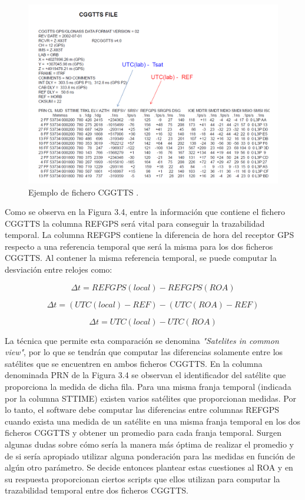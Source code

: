\begin{figure}
	\centering
	\includegraphics[width=1\textwidth]{imagenes/cggtts.PNG}
	\caption{\label{fig1}Ejemplo de fichero CGGTTS \cite{timetransfer}.}
\end{figure}

Como se observa en la Figura 3.4, entre la información que contiene el fichero CGGTTS la columna REFGPS será vital para conseguir la trazabilidad temporal. La columna REFGPS contiene la diferencia de hora del receptor GPS respecto a una referencia temporal que será la misma para los dos ficheros CGGTTS. Al contener la misma referencia temporal, se puede computar la desviación entre relojes como:

\begin{equation}
\Delta t = REFGPS(local) - REFGPS(ROA) 
\end{equation}

\begin{equation}
\Delta t = (UTC(local) - REF) - (UTC(ROA) - REF)
\end{equation}

\begin{equation}
\Delta t = UTC(local) - UTC(ROA)
\end{equation}

La técnica que permite esta comparación se denomina \textit{"Satelites in common view"}, por lo que se tendrán que computar las diferencias solamente entre los satélites que se encuentren en ambos ficheros CGGTTS. En la columna denominada PRN de la Figura 3.4 se observan el identificador del satélite que proporciona la medida de dicha fila. Para una misma franja temporal (indicada por la columna STTIME) existen varios satélites que proporcionan medidas. Por lo tanto, el software debe computar las diferencias entre columnas REFGPS cuando exista una medida de un satélite en una misma franja temporal en los dos ficheros CGGTTS y obtener un promedio para cada franja temporal. Surgen algunas dudas sobre cómo sería la manera más óptima de realizar el promedio y de si sería apropiado utilizar alguna ponderación para las medidas en función de algún otro parámetro. Se decide entonces plantear estas cuestiones al ROA y en su respuesta proporcionan ciertos scripts que ellos utilizan para computar la trazabilidad temporal entre dos ficheros CGGTTS. \newline

